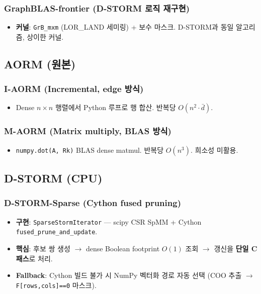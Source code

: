 \documentclass[11pt,a4paper]{article}
\begin{document}
\subsubsection{GraphBLAS-frontier (D-STORM 로직 재구현)}
\begin{itemize}[leftmargin=1.4em]
  \item \textbf{커널}: \texttt{GrB\_mxm} (LOR\_LAND 세미링) + 보수 마스크. D-STORM과 동일 알고리즘, 상이한 커널.
\end{itemize}

\subsection{AORM (원본)}
\subsubsection{I-AORM (Incremental, edge 방식)}
\begin{itemize}[leftmargin=1.4em]
  \item Dense $n \times n$ 행렬에서 Python 루프로 행 합산. 반복당 $O(n^2 \cdot \bar{d})$.
\end{itemize}
\subsubsection{M-AORM (Matrix multiply, BLAS 방식)}
\begin{itemize}[leftmargin=1.4em]
  \item \texttt{numpy.dot(A, Rk)} BLAS dense matmul. 반복당 $O(n^3)$. 희소성 미활용.
\end{itemize}

\subsection{D-STORM (CPU)}
\subsubsection{D-STORM-Sparse (Cython fused pruning)}
\begin{itemize}[leftmargin=1.4em]
  \item \textbf{구현}: \texttt{SparseStormIterator} --- scipy CSR SpMM + Cython \texttt{fused\_prune\_and\_update}.
  \item \textbf{핵심}: 후보 쌍 생성 $\to$ dense Boolean footprint $O(1)$ 조회 $\to$ 갱신을 \textbf{단일 C 패스}로 처리.
  \item \textbf{Fallback}: Cython 빌드 불가 시 NumPy 벡터화 경로 자동 선택 (COO 추출 $\to$ \texttt{F[rows,cols]==0} 마스크).
\end{itemize}
\end{document}
